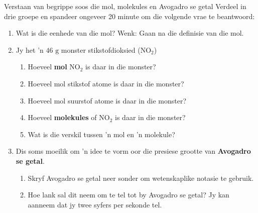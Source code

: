             \begin{groupdiscussion}{Verstaan van begrippe soos die mol, molekules en Avogadro se getal
      }
            \nopagebreak
      \label{m38717*id279596}Verdeel in drie groepe en spandeer ongeveer 20 minute om die volgende vrae te beantwoord:
      \label{m38717*id279603}\begin{enumerate}[noitemsep, label=\textbf{\arabic*}. ] 
            \label{m38717*uid39}\item Wat is die eenhede van die mol? Wenk: Gaan na die definisie van die mol.
\label{m38717*uid40}\item Jy het  'n $46 \text{ g}$ monster stikstofdioksied ($\text{NO}_{2}$)
\label{m38717*id279631}\begin{enumerate}[noitemsep, label=\textbf{\alph*}. ] 
\item Hoeveel \textbf{mol} $\text{NO}_{2}$ is daar in die monster?
\item Hoeveel mol stikstof atome is daar in die monster?
\item Hoeveel mol suurstof atome is daar in die monster?
\item Hoeveel \textbf{molekules} of $\text{NO}_{2}$ is daar in die monster?
\item Wat is die verskil tussen  'n mol en 'n molekule?
\end{enumerate}
        \label{m38717*uid44}\item Dis soms moeilik om   'n idee te vorm oor die presiese grootte van \textbf{Avogadro se getal}.
\label{m38717*id279703}\begin{enumerate}[noitemsep, label=\textbf{\alph*}. ] 
            \label{m38717*uid45}\item Skryf Avogadro se getal neer sonder om wetenskaplike notasie te gebruik.
\label{m38717*uid46}\item Hoe lank sal dit neem om te tel tot by Avogadro se getal? Jy kan aanneem
              dat jy twee syfers per sekonde tel.
\end{enumerate}
        \end{enumerate}
\end{groupdiscussion}


